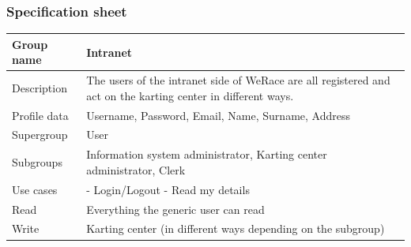 \documentclass{beamer}
\newcommand{\kc}{WeRace}
\begin{document}
\begin{frame}
    \frametitle{Specification sheet}
    \begin{table}
        \tiny
        \begin{tabular}{|p{2cm}|p{6cm}|}
        \hline
        Group name & \textbf{Intranet} \\
        \hline
        Description & The users of the intranet side of \kc{} are 
        all registered and act on the karting center in different ways. \\
        \hline
        Profile data & Username, Password, Email, Name, Surname, Address \\
        \hline
        Supergroup & User \\
        \hline
        Subgroups & Information system administrator, Karting center administrator, Clerk \\
        \hline
        Use cases &
        - Login/Logout \newline
        - Read my details \\
        \hline
        Read & Everything the generic user can read \\
        \hline
        Write & Karting center (in different ways depending on the subgroup) \\
        \hline
        \end{tabular}
    \end{table}
\end{frame}
\end{document}
